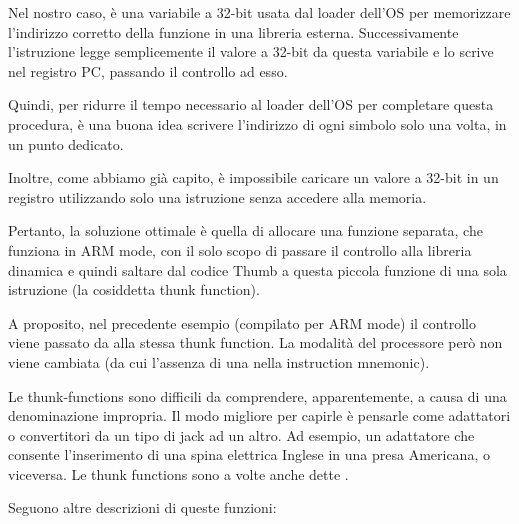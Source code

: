 Nel nostro caso,  è una variabile a 32-bit usata dal loader dell'\ac{OS} per memorizzare l'indirizzo corretto
della funzione in una libreria esterna.
Successivamente l'istruzione  legge semplicemente il valore a 32-bit da questa variabile e lo scrive nel registro \ac{PC},
passando il controllo ad esso.

Quindi, per ridurre il tempo necessario al loader dell'\ac{OS} per completare questa procedura, è una buona idea scrivere l'indirizzo
di ogni simbolo solo una volta, in un punto dedicato.

Inoltre, come abbiamo già capito, è impossibile caricare un valore a 32-bit in un registro utilizzando solo una istruzione senza
accedere alla memoria.

Pertanto, la soluzione ottimale è quella di allocare una funzione separata, che funziona in ARM mode, con il solo scopo di passare
il controllo alla libreria dinamica e quindi saltare dal codice Thumb a questa piccola funzione di una sola istruzione
(la cosiddetta \gls{thunk function}).

A proposito, nel precedente esempio (compilato per ARM mode) il controllo viene passato da  alla stessa \gls{thunk function}.
La modalità del processore però non viene cambiata (da cui l'assenza di una  nella instruction mnemonic).


Le thunk-functions sono difficili da comprendere, apparentemente, a causa di una denominazione impropria.
Il modo migliore per capirle è pensarle come adattatori o convertitori da un tipo di jack ad un altro.
Ad esempio, un adattatore che consente l'inserimento di una spina elettrica Inglese in una presa Americana, o viceversa.
Le thunk functions sono a volte anche dette .

Seguono altre descrizioni di queste funzioni:

